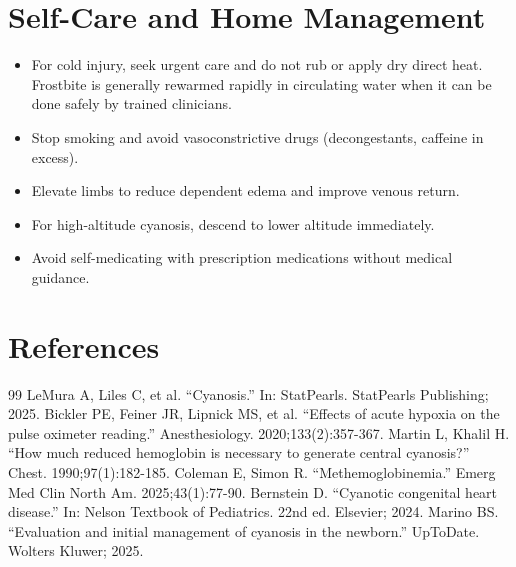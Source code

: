 \section*{Self-Care and Home Management}
\begin{itemize}
  \item For cold injury, seek urgent care and do not rub or apply dry direct heat. Frostbite is generally rewarmed rapidly in circulating water when it can be done safely by trained clinicians.
  \item Stop smoking and avoid vasoconstrictive drugs (decongestants, caffeine in excess).
  \item Elevate limbs to reduce dependent edema and improve venous return.
  \item For high-altitude cyanosis, descend to lower altitude immediately.
  \item Avoid self-medicating with prescription medications without medical guidance.
\end{itemize}

\section*{References}
\begin{thebibliography}{99}
 LeMura A, Liles C, et al. ``Cyanosis.'' In: StatPearls. StatPearls Publishing; 2025.
 Bickler PE, Feiner JR, Lipnick MS, et al. ``Effects of acute hypoxia on the pulse oximeter reading.'' Anesthesiology. 2020;133(2):357-367.
 Martin L, Khalil H. ``How much reduced hemoglobin is necessary to generate central cyanosis?'' Chest. 1990;97(1):182-185.
 Coleman E, Simon R. ``Methemoglobinemia.'' Emerg Med Clin North Am. 2025;43(1):77-90.
 Bernstein D. ``Cyanotic congenital heart disease.'' In: Nelson Textbook of Pediatrics. 22nd ed. Elsevier; 2024.
 Marino BS. ``Evaluation and initial management of cyanosis in the newborn.'' UpToDate. Wolters Kluwer; 2025.
\end{thebibliography}

